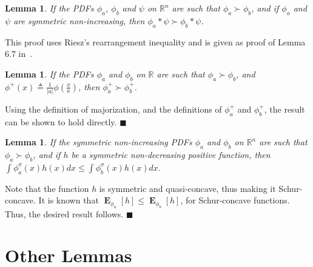 \documentclass[twocolumn]{autart}
\DeclareMathOperator*{\E}{{\mathbf E}}        \let\Pr\undefined \DeclareMathOperator{\Pr}{{\mathbf P}}        \DeclareMathOperator*{\argmax}{arg\,max}
\newtheorem{lemma}[theorem]{Lemma}
\newenvironment{proof}[1][Proof]{\begin{trivlist}
\item[\hskip \labelsep {\bfseries #1}]}{\end{trivlist}}
\renewcommand{\qed}{$\blacksquare$}
\begin{document}
\begin{lemma} \label{Lemma:Maj2}
If the PDFs $\phi_a$, $\phi_b$ and $\psi$ on $\mathbb{R}^n$ are such that $\phi_a \succ \phi_b$, and if $\phi_a$ and $\psi$ are symmetric non-increasing, then $\phi_a \ast \psi \succ \phi_b \ast \psi$.
\end{lemma}
This proof uses Riesz's rearrangement inequality and is given as proof of Lemma~$6.7$ in~\cite{Hajek2008}.

\begin{lemma} \label{Lemma:Maj3}
If the PDFs $\phi_a$ and $\phi_b$ on $\mathbb{R}$ are such that $\phi_a \succ \phi_b$, and $\phi^+(x) \triangleq \frac{1}{|a|} \phi(\frac{x}{a})$, then $\phi^+_a \succ \phi^+_b$.
\end{lemma}
\begin{proof}
Using the definition of majorization, and the definitions of $\phi_a^+$ and $\phi_b^+$, the result can be shown to hold directly. \hfill \qed
\end{proof}

\begin{lemma} \label{Lemma:Maj4}
If the symmetric non-increasing PDFs $\phi_a$ and $\phi_b$ on $\mathbb{R}^n$ are such that $\phi_a \succ \phi_b$, and if $h$ be a symmetric non-decreasing positive function, then $\int \phi_a^\sigma(x) h(x) dx \le \int \phi_b^\sigma(x) h(x) dx$.
\end{lemma}
\begin{proof}
Note that the function $h$ is symmetric and quasi-concave, thus making it Schur-concave. It is known that $\E_{\phi_a}[h] \le \E_{\phi_b}[h]$, for Schur-concave functions. Thus, the desired result follows. \hfill \qed
\end{proof}

\section{Other Lemmas}
\end{document}
